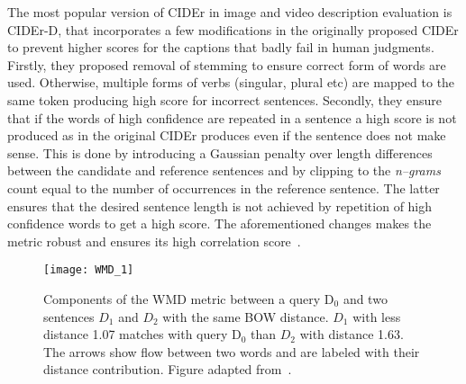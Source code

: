 \documentclass[10pt,journal,compsoc]{IEEEtran}
\begin{document}
The most popular version of CIDEr in image and video description evaluation is CIDEr-D, that incorporates a few modifications in the originally proposed CIDEr to prevent higher scores for the captions that badly fail in human judgments. Firstly, they proposed removal of stemming to ensure correct form of words are used. Otherwise, multiple forms of verbs (singular, plural etc) are mapped to the same token producing high score for incorrect sentences. Secondly, they ensure that if the words of high confidence are repeated in a sentence a high score is not produced as in the original CIDEr produces even if the sentence does not make sense. This is done by introducing a Gaussian penalty over length differences between the candidate and reference sentences and by clipping to the \textit{n--grams} count equal to the number of occurrences in the reference sentence. The latter ensures that the desired sentence length is not achieved by repetition of high confidence words to get a high score. The aforementioned changes makes the metric robust and ensures its high correlation score~\cite{vedantam2015cider}.

\begin{figure}[b] %
   \centering
   \texttt{[image: WMD\_1]} 
\vspace{-2mm}
   \caption{Components of the WMD metric between a query D$_0$ and two sentences $D_1$ and $D_2$ with the same BOW distance. $D_1$ with less distance 1.07 matches with query D$_0$ than $D_2$ with distance 1.63. The arrows show flow between two words and are labeled with their distance contribution. Figure adapted from~\cite{kusner2015word}.}
   \label{fig:wmdmetric}
\end{figure}
\end{document}
